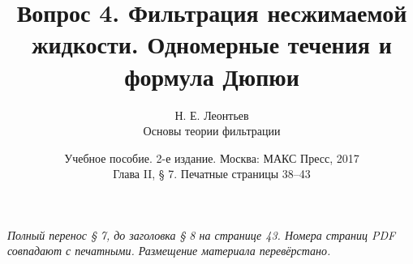 \documentclass[12pt,a4paper]{article}
\title{Вопрос 4. Фильтрация несжимаемой жидкости. Одномерные течения и формула Дюпюи}
\author{Н. Е. Леонтьев\\\large Основы теории фильтрации}
\date{Учебное пособие. 2-е издание. Москва: МАКС Пресс, 2017\\Глава II, § 7. Печатные страницы 38--43}
\begin{document}
\maketitle
\noindent\textit{Полный перенос § 7, до заголовка § 8 на странице 43. Номера страниц PDF совпадают с печатными. Размещение материала перевёрстано.}

\end{document}
